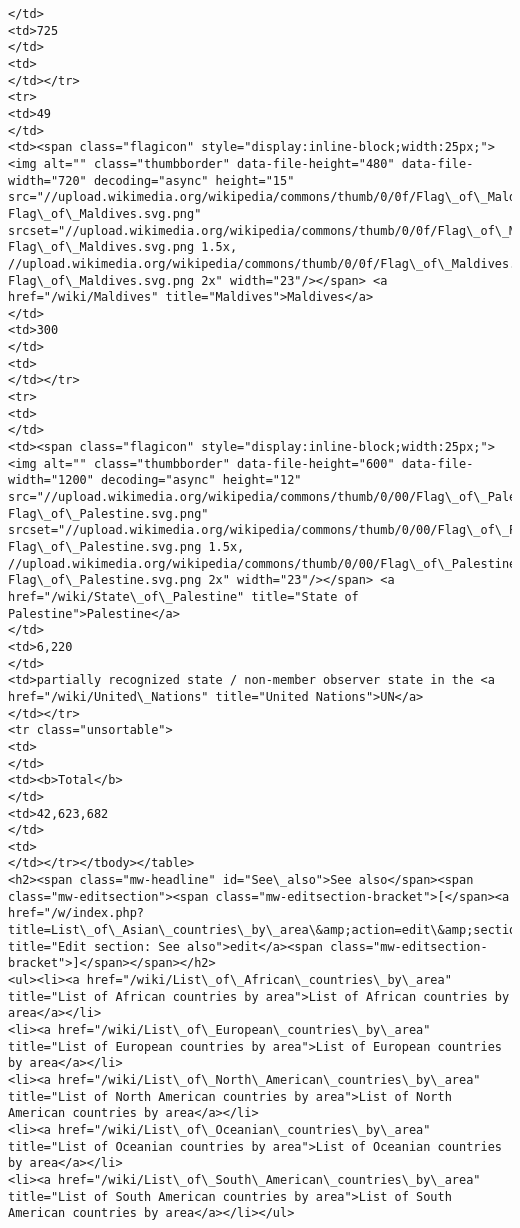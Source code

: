 \documentclass[11pt]{article}
\begin{document}
\begin{Verbatim}[commandchars=\\\{\}]
</td>
<td>725
</td>
<td>
</td></tr>
<tr>
<td>49
</td>
<td><span class="flagicon" style="display:inline-block;width:25px;"><img alt="" class="thumbborder" data-file-height="480" data-file-width="720" decoding="async" height="15" src="//upload.wikimedia.org/wikipedia/commons/thumb/0/0f/Flag\_of\_Maldives.svg/23px-Flag\_of\_Maldives.svg.png" srcset="//upload.wikimedia.org/wikipedia/commons/thumb/0/0f/Flag\_of\_Maldives.svg/35px-Flag\_of\_Maldives.svg.png 1.5x, //upload.wikimedia.org/wikipedia/commons/thumb/0/0f/Flag\_of\_Maldives.svg/45px-Flag\_of\_Maldives.svg.png 2x" width="23"/></span> <a href="/wiki/Maldives" title="Maldives">Maldives</a>
</td>
<td>300
</td>
<td>
</td></tr>
<tr>
<td>
</td>
<td><span class="flagicon" style="display:inline-block;width:25px;"><img alt="" class="thumbborder" data-file-height="600" data-file-width="1200" decoding="async" height="12" src="//upload.wikimedia.org/wikipedia/commons/thumb/0/00/Flag\_of\_Palestine.svg/23px-Flag\_of\_Palestine.svg.png" srcset="//upload.wikimedia.org/wikipedia/commons/thumb/0/00/Flag\_of\_Palestine.svg/35px-Flag\_of\_Palestine.svg.png 1.5x, //upload.wikimedia.org/wikipedia/commons/thumb/0/00/Flag\_of\_Palestine.svg/46px-Flag\_of\_Palestine.svg.png 2x" width="23"/></span> <a href="/wiki/State\_of\_Palestine" title="State of Palestine">Palestine</a>
</td>
<td>6,220
</td>
<td>partially recognized state / non-member observer state in the <a href="/wiki/United\_Nations" title="United Nations">UN</a>
</td></tr>
<tr class="unsortable">
<td>
</td>
<td><b>Total</b>
</td>
<td>42,623,682
</td>
<td>
</td></tr></tbody></table>
<h2><span class="mw-headline" id="See\_also">See also</span><span class="mw-editsection"><span class="mw-editsection-bracket">[</span><a href="/w/index.php?title=List\_of\_Asian\_countries\_by\_area\&amp;action=edit\&amp;section=1" title="Edit section: See also">edit</a><span class="mw-editsection-bracket">]</span></span></h2>
<ul><li><a href="/wiki/List\_of\_African\_countries\_by\_area" title="List of African countries by area">List of African countries by area</a></li>
<li><a href="/wiki/List\_of\_European\_countries\_by\_area" title="List of European countries by area">List of European countries by area</a></li>
<li><a href="/wiki/List\_of\_North\_American\_countries\_by\_area" title="List of North American countries by area">List of North American countries by area</a></li>
<li><a href="/wiki/List\_of\_Oceanian\_countries\_by\_area" title="List of Oceanian countries by area">List of Oceanian countries by area</a></li>
<li><a href="/wiki/List\_of\_South\_American\_countries\_by\_area" title="List of South American countries by area">List of South American countries by area</a></li></ul>

\end{Verbatim}
\end{document}
